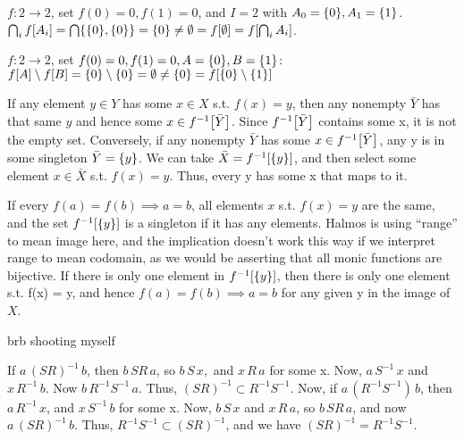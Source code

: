\documentclass{article}
\DeclarePairedDelimiter\brc{[}{]}
\DeclarePairedDelimiter\crl{\{}{\}}
\newcommand{\nl}[0]{\newline}
\begin{document}
\begin{flushleft}
 \nl
$f: 2 \rightarrow 2$, set $f(0) = 0, f(1) = 0$, and $I = 2$ with $A_0 = \crl{0}, A_1 = \crl{1}$. \nl
$\bigcap_i f\brc*{A_i} = \bigcap  \crl{\crl{0}, \crl{0}} = \crl{0} \neq \emptyset = f\brc*{\emptyset} = f\brc*{\bigcap_i A_i}$. \nl

 \nl
$f: 2 \rightarrow 2$, set $f(0) = 0, f(1) = 0, A = \crl{0}, B = \crl{1}$: \nl
$f\brc*{A} \setminus f\brc*{B} = \crl{0} \setminus \crl{0} = \emptyset \neq \crl{0} = f\brc*{\crl{0} \setminus \crl{1}}$ \nl

 \nl
If any element $y \in Y$ has some $x \in X$ s.t. $f(x) = y$, then any nonempty $\bar{Y}$ has that same $y$ and hence some $x \in f^{-1}\brc*{\bar{Y}}$. Since $f^{-1}\brc*{\bar{Y}}$ contains some x, it is not the empty set. \nl \nl
Conversely, if any nonempty $\bar{Y}$ has some $x \in f^{-1}\brc*{\bar{Y}}$, any y is in some singleton $\bar{Y} = \crl{y}$. We can take $\bar{X} = f^{-1}\brc*{\crl{y}}$, and then select some element $x \in \bar{X}$ s.t. $f(x) = y$. Thus, every y has some x that maps to it. \nl

 \nl
If every $f(a) = f(b) \implies a = b$, all elements $x$ s.t. $f(x) = y$ are the same, and the set $f^{-1}\brc*{\crl{y}}$ is a singleton if it has any elements. Halmos is using ``range'' to mean image here, and the implication doesn't work this way if we interpret range to mean codomain, as we would be asserting that all monic functions are bijective. \nl \nl
If there is only one element in $f^{-1}\brc*{\crl{y}}$, then there is only one element s.t. f(x) = y, and hence $f(a) = f(b) \implies a = b$ for any given y in the image of $X$. \nl

 \nl
brb shooting myself

 \nl

 \nl
If $a \, (SR)^{-1} \, b$, then $b \, SR \, a$, so $b \, S \, x,$ and $ x \, R \, a$ for some x. Now, $a \, S^{-1} \, x$ and $x \, R^{-1} \, b$. Now $b \, R^{-1}S^{-1} \, a$. Thus, $(SR)^{-1} \subset R^{-1}S^{-1}$. \nl
Now, if $a \, (R^{-1}S^{-1}) \, b$, then $a \, R^{-1} \, x$, and $x \, S^{-1} \, b$ for some x. Now, $b \, S \, x$ and $x \, R \, a$, so $b \, SR \, a$, and now $a \, (SR)^{-1}\, b$. Thus, $R^{-1}S^{-1} \subset (SR)^{-1}$, and we have $(SR)^{-1} = R^{-1}S^{-1}$. \nl


\end{flushleft}
\end{document}
